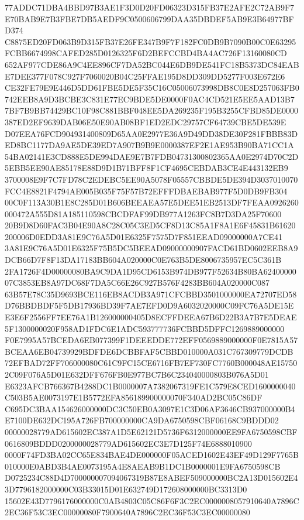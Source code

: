 \documentclass[UTF8,fontset=fandol,zihao=-4,a4paper]{ctexart}
\begin{document}
{{77ADDC71DBA4BBD97B3AE1F3D0D20FD06323D315FB37E2AFE2C72AB9F7E70BAB9E7B3FBE7DB5AEDF9C0500606799DAA35DBDEF5AB9E3B64977BFD374
C8875ED20FD063B9D315FB37E26FE347B9F7F182FC0DB9B7090B00C0E63295FCBB6674998CAFED285D0126325F6D2BEFCCBD4BA4AC726F13160080CD
652AF977CDE86A9C4EE896CF7DA52BC044E6DB9DE541FC18B5373DC84EABE7DEE377F078C927F7060020B04C25FFAE195D8DD309DD5277F003E672E6
CE32FE79E9E446D5DD61FBE5DE5F35C16C05006073998DB8C0E8D257063FB0742EEB8A9D3BCBE3C831E77EC9BDE5DE0000F0AC4CD521E5EE5AAD13B7
7BF7B9BB74429BC10F98C881BBF048EE5DA269235F195B3255CFBD85DE0000387ED2EF9639DAB06E50E90AB08BF1ED2EDC29757CF64739CBE5DE539E
D07EEA76FCD904931400809D65AA0E2977E36A9D49DD38DE30F281FBBB83DED8BC1177DA9AE5DE39ED7A907B9B9E0000387EF2E1AE953B90BA71CC1A
54BA02141E3CD888E5DE994DAE9E7B7FDB04731300802365AA0E2974D70C2D5EBB5EE90AE85178E88D9D1B71BFF8F1CF4695CEBDAB3CE4E443132EB9
3700008E9F7C7FD78C2EDEBC5EE90A5078F05557CBBDE5DE394D3037010070FCC4E8821F4794AE005B035F75F57B72EFFFDBAEBAB977F5D0DB9FB304
00C0F113A30B1E8C285D01B606BEEAEA57E5DEE51EB2513DF7FEAA0926260000472A555D81A185110598CBCDFAF99DB977A1263FC8B7D3DA25F70600
20B9D8D60FAC3B04E90A8C28C05C3ED5CF8D13C85A1F8A1E6F45831B61620200006D0EDD3A81E9C76A5D01E6325F7575D7F851EEAD09000000A7CE41
3A81E9C76A5D01E6325F75B5DC5BEEAD09000000907FACD61BD0602EEB8A9DCB66D7F8F13DA17183BB604A020000C0E763B5DE8006735957EC5C361B
2FA1726F4D00000080BA9C9DA1D95CD6153B974DB977F52634B80BA6240000007C3853EB8A97DC68F7DA5C66E26C927B576F4283BB604A020000C087
63B57E78C35D9693BCE116EB8ACDB3A971CFCBBD3501000000EA72707ED58D76BBDBDF5F5DB17936BD39F7AE7EFD0D9A6032020000C09FC76A5DE15E
E3E6F2556FF7EE76A1B126000000405D8ECFFDEEA67B6D22B3A7B7E5DEAE5F1300000020F958AD1FDC6E1ADC593777736FCBBD5DFFC1269889000000
F0E7995A57BCEDA6EB077399F1DEEEDDE772EFF0569889000000F0E7815A57BCEAA6EB04739929BDFDE6DCBBFAF5CBBD010000A031C767309779DCDB
72EFBAD72FF706000080C61C9FC15CE6716FB7EF730FC7760B000048AE157502C09F076A5D01E632DFF676FB0E977BC7B6C234040000803B076A5D01
E6323AFCB766367B4288DC1B0000007A7382067319FE1C579E8CED1600000040C503B5AE0073197E1B5772EFA856189900000070F340AD2BC05C86DF
C695DC3BAA154626000000DC3C50EB0A3097E1C3D06AF3646CB937000000B4E7100DE632DC195A726FB700000000CA9DA6750598CBF06168C9BDDD02
00000028779AD615602EC387A1D5E62121D5736F6312000000EE9FA6750598CBF0616809BDDD0200000028779AD615602EC3E7D125F74E6888010900
0000F74FD3BA02CC65E834BAE4DE000000F05ACED1602E43EF49D129F7765B010000E0ABD3B4AE0073195A4E8AEAB9B1DC1B0000001E9FA6750598CB
D0725234C88D4D700000007094067319B87E8ABEF509000000BC2A13D015602E43D7796182000000C03B33015D01E632749D172608000000BC3313D0
15602E43D7796176000000C0AB4803C05C86F6F3C2EC0000008057910640A7896C2EC36F53C3EC00000080F7900640A7896C2EC36F53C3EC00000080
}}
\end{document}
